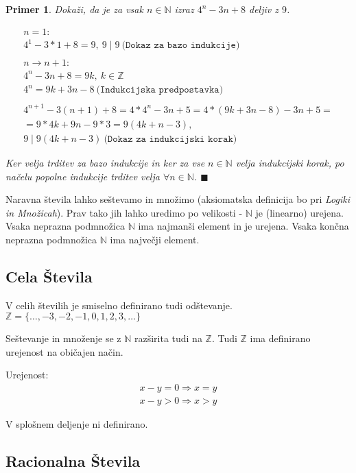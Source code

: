 \documentclass[a4paper]{article}
\newtheorem{primer}[izrek]{Primer}
\newcommand{\nn}{\mathbb{N}} %
\newcommand{\zz}{\mathbb{Z}} %
\newcommand{\konecdokaza}{$\blacksquare$} %
\begin{document}
\begin{primer}
  Dokaži, da je za vsak $n \in \nn$ izraz $4^n - 3n + 8$ deljiv z $9$.

  \begin{gather*}
    n = 1: \\
    4^1 - 3*1 + 8 = 9,~9 \mid 9~ \texttt{(Dokaz za bazo indukcije)}\\
    \\
    n \rightarrow n+1: \\
    4^n - 3n + 8 = 9k,~k \in \zz \\
    4^n = 9k + 3n - 8~ \texttt{(Indukcijska predpostavka)}\\
    \\
    4^{n+1} - 3(n+1) + 8 = 4*4^n - 3n + 5 = 4*(9k + 3n - 8) - 3n + 5 =\\
    = 9*4k + 9n - 9*3 = 9(4k + n - 3), \\
    9 \mid 9(4k + n - 3)~ \texttt{(Dokaz za indukcijski korak)}
  \end{gather*}

  Ker velja trditev za bazo indukcije in ker za vse $n \in \nn$ velja indukcijski korak, po načelu
  popolne indukcije trditev velja $\forall n \in \nn$. \konecdokaza
\end{primer}

Naravna števila lahko seštevamo in množimo (aksiomatska definicija bo pri \emph{Logiki in Množicah}).
Prav tako jih lahko uredimo po velikosti - $\nn$ je (linearno) urejena. Vsaka neprazna podmnožica $\nn$
ima najmanši element in je urejena. Vsaka končna neprazna podmnožica $\nn$ ima največji element.

\subsection{Cela Števila}

V celih številih je smiselno definirano tudi odštevanje. $\zz = \{\dots, -3, -2, -1, 0, 1, 2, 3, \dots\}$

Seštevanje in množenje se z $\nn$ razširita tudi na $\zz$. Tudi $\zz$ ima definirano urejenost na
običajen način.

Urejenost:
\begin{gather*}
  x - y = 0 \Rightarrow x = y \\
  x - y > 0 \Rightarrow x > y
\end{gather*}

V splošnem deljenje ni definirano.

\subsection{Racionalna Števila}
\end{document}
